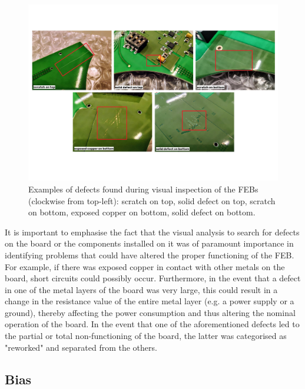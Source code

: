 \begin{figure}[ht]
    \centering
    \includegraphics[width=1\textwidth]{Images/chap2/immagini_difetti.pdf}
    \caption{Examples of defects found during visual inspection of the FEBs (clockwise from top-left): scratch on top, solid defect on top, scratch on bottom, exposed copper on bottom, solid defect on bottom.}
    \label{figScratches}
\end{figure}

\par
It is important to emphasise the fact that the visual analysis to search for defects on the board or the components installed on it was of paramount importance in identifying problems that could have altered the proper functioning of the FEB. For example, if there was exposed copper in contact with other metals on the board, short circuits could possibly occur. Furthermore, in the event that a defect in one of the metal layers of the board was very large, this could result in a change in the resistance value of the entire metal layer (e.g. a power supply or a ground), thereby affecting the power consumption and thus altering the nominal operation of the board. In the event that one of the aforementioned defects led to the partial or total non-functioning of the board, the latter was categorised as "reworked" and separated from the others. %


\subsection{Bias} \label{bias}

